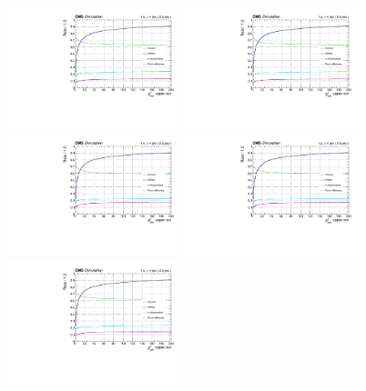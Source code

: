 \begin{figure}[p]
    \centering
    \includegraphics[width=0.45\textwidth]{figure/bbSep_16_el_Chi2_uppercut_bbSep.pdf}
    \includegraphics[width=0.45\textwidth]{figure/bbSep_16_mu_Chi2_uppercut_bbSep.pdf}
    \includegraphics[width=0.45\textwidth]{figure/bbSep_17_el_Chi2_uppercut_bbSep.pdf}
    \includegraphics[width=0.45\textwidth]{figure/bbSep_17_mu_Chi2_uppercut_bbSep.pdf}
    \includegraphics[width=0.45\textwidth]{figure/bbSep_18_el_Chi2_uppercut_bbSep.pdf}

\end{figure}
